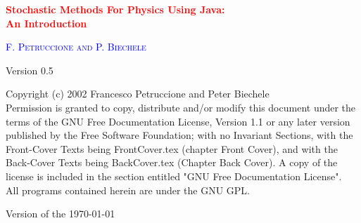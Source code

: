 

\begin{titlepage}

\begin{center}
\huge 
\textcolor{red}{
\textbf{
Stochastic Methods For Physics Using Java: \\
An Introduction
} }
\end{center}
\vspace*{.5cm}

\begin{center}
\LARGE
\textcolor{blue}{
\textsc{F. Petruccione and P. Biechele}}
\end{center}
\vfill
\begin{center}
\textsf{\LARGE Version 0.5}
\end{center}
\vfill
\begin{center}
\large
  Copyright (c)  2002  Francesco Petruccione and Peter Biechele \\
      Permission is granted to copy, distribute and/or modify this document
      under the terms of the GNU Free Documentation License, Version 1.1
      or any later version published by the Free Software Foundation;
      with no Invariant Sections, with the
      Front-Cover Texts being FrontCover.tex (chapter Front Cover), and
      with the Back-Cover Texts being BackCover.tex (Chapter Back Cover).
      A copy of the license is included in the section entitled "GNU
      Free Documentation License".\\
      All programs contained herein are under the GNU GPL.
\end{center}
\vspace*{.5cm}

\begin{center}
\large
\textsf{Version of the \today}
\end{center}

\end{titlepage}


